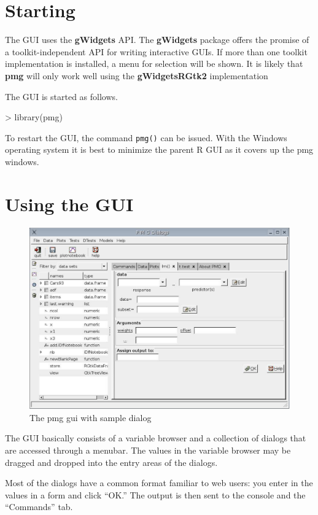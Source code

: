 \documentclass[12pt]{article}
\newcommand{\RFunc}[1]{\texttt{#1()}}
\newcommand{\RPackage}[1]{\textbf{#1}}
\begin{document}
\section{Starting}

The GUI uses the \RPackage{gWidgets} API. The \RPackage{gWidgets}
package offers the promise of a toolkit-independent API for writing
interactive GUIs. If more than one toolkit implementation is
installed, a menu for selection will be shown. It is likely that
\RPackage{pmg} will only work well using the \RPackage{gWidgetsRGtk2}
implementation

The GUI is started as follows.
\begin{Soutput}
> library(pmg)
\end{Soutput}

To restart the GUI, the command \RFunc{pmg} can be issued. With the
Windows operating system it is best to minimize the parent R GUI as it
covers up the pmg windows.

\section{Using the GUI}

\begin{figure}[htbp]
  \centering
  \includegraphics[width=.8\textwidth]{pmg-sample-dialog}
  \caption{The pmg gui with sample dialog}
  \label{fig:pmg-gui-sample-dialog}
\end{figure}


The GUI basically consists of a variable browser and a collection of
dialogs that are accessed through a menubar. The values in the
variable browser may be dragged and dropped into the entry areas of
the dialogs. 

Most of the dialogs have a common format familiar to web users: you
enter in the values in a form and click ``OK.'' The output is then
sent to the console and the ``Commands'' tab.
\end{document}
